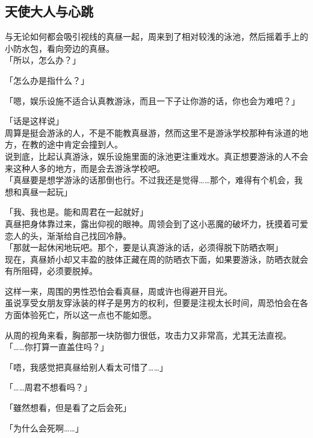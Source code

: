 \subsection{天使大人与心跳}

与无论如何都会吸引视线的真昼一起，周来到了相对较浅的泳池，然后摇着手上的小防水包，看向旁边的真昼。\\

「所以，怎么办？」

「怎么办是指什么？」

「嗯，娱乐设施不适合认真教游泳，而且一下子让你游的话，你也会为难吧？」

「话是这样说」\\

周算是挺会游泳的人，不是不能教真昼游，然而这里不是游泳学校那种有泳道的地方，在教的途中肯定会撞到人。\\

说到底，比起认真游泳，娱乐设施里面的泳池更注重戏水。真正想要游泳的人不会来这种人多的地方，而是会去游泳学校吧。\\

「真昼要是想学游泳的话那倒也行。不过我还是觉得……那个，难得有个机会，我想和真昼一起玩」

「我、我也是。能和周君在一起就好」\\

真昼把身体靠过来，露出仰视的眼神。周领会到了这小恶魔的破坏力，抚摸着可爱恋人的头，渐渐给自己找回冷静。\\

「那就一起休闲地玩吧。那个，要是认真游泳的话，必须得脱下防晒衣啊」\\

现在，真昼娇小却又丰盈的肢体正藏在周的防晒衣下面，如果要游泳，防晒衣就会有所阻碍，必须要脱掉。

这样一来，周围的男性恐怕会看真昼，周或许也得避开目光。\\

虽说享受女朋友穿泳装的样子是男方的权利，但要是注视太长时间，周恐怕会在各方面体验死亡，所以这一点也不能如愿。

从周的视角来看，胸部那一块防御力很低，攻击力又非常高，尤其无法直视。\\

「……你打算一直盖住吗？」

「唔，我感觉把真昼给别人看太可惜了……」

「……周君不想看吗？」

「雖然想看，但是看了之后会死」

「为什么会死啊……」\\

